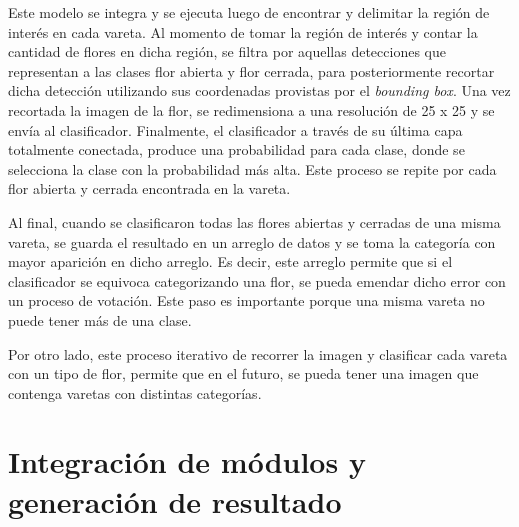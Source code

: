 Este modelo se integra y se ejecuta luego de encontrar y delimitar la región de interés en cada vareta. Al momento de tomar la región de interés y contar la cantidad de flores en dicha región, se filtra por aquellas detecciones que representan a las clases flor abierta y flor cerrada, para posteriormente recortar dicha detección utilizando sus coordenadas provistas por el \textit{bounding box}. Una vez recortada la imagen de la flor, se redimensiona a una resolución de 25 x 25 y se envía al clasificador. Finalmente, el clasificador a través de su última capa totalmente conectada, produce una probabilidad para cada clase, donde se selecciona la clase con la probabilidad más alta. Este proceso se repite por cada flor abierta y cerrada encontrada en la vareta. 

Al final, cuando se clasificaron todas las flores abiertas y cerradas de una misma vareta, se guarda el resultado en un arreglo de datos y se toma la categoría con mayor aparición en dicho arreglo. Es decir, este arreglo permite que si el clasificador se equivoca categorizando una flor, se pueda emendar dicho error con un proceso de votación. Este paso es importante porque una misma vareta no puede tener más de una clase. 

Por otro lado, este proceso iterativo de recorrer la imagen y clasificar cada vareta con un tipo de flor, permite que en el futuro, se pueda tener una imagen que contenga varetas con distintas categorías.
\newpage
\section{Integración de módulos y generación de resultado}



%




